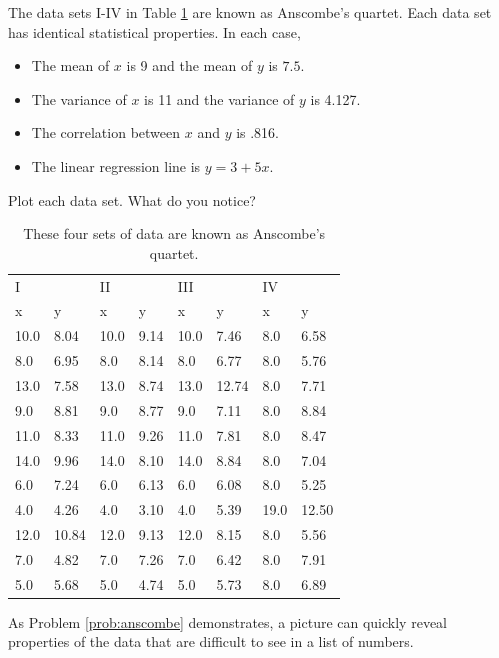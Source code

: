 \begin{problem}\label{prob:anscombe}
The data sets I-IV in Table \ref{table:anscombe} are known as Anscombe's quartet. 
Each data set has identical statistical properties. 
In each case,
\begin{itemize}
\item The mean of $x$ is 9 and the mean of $y$ is $7.5$.
\item The variance of $x$ is 11 and the variance of $y$ is 4.127.
\item The correlation between $x$ and $y$ is .816.
\item The linear regression line is $y=3+5x$.
\end{itemize}
Plot each data set. What do you notice?

\begin{table}[H]
\begin{tabular}{l l  |  l l  |  l l  |  l l }
I & & II & & III & & IV\\
x & y & x & y & x & y & x & y \\
\hline
10.0 & 8.04 & 10.0 & 9.14 & 10.0 & 7.46 & 8.0 & 6.58 \\
8.0 & 6.95 & 8.0 & 8.14 & 8.0 & 6.77 & 8.0 & 5.76 \\
13.0 & 7.58 & 13.0 & 8.74 & 13.0 & 12.74 & 8.0 & 7.71 \\
9.0 & 8.81 & 9.0 & 8.77 & 9.0 & 7.11 & 8.0 & 8.84 \\
11.0 & 8.33 & 11.0 & 9.26 & 11.0 & 7.81 & 8.0 & 8.47 \\
14.0 & 9.96 & 14.0 & 8.10 & 14.0 & 8.84 & 8.0 & 7.04 \\
6.0 & 7.24 & 6.0 & 6.13 & 6.0 & 6.08 & 8.0 & 5.25 \\
4.0 & 4.26 & 4.0 & 3.10 & 4.0 & 5.39 & 19.0 & 12.50 \\
12.0 & 10.84 & 12.0 & 9.13 & 12.0 & 8.15 & 8.0 & 5.56 \\
7.0 & 4.82 & 7.0 & 7.26 & 7.0 & 6.42 & 8.0 & 7.91 \\
5.0 & 5.68 & 5.0 & 4.74 & 5.0 & 5.73 & 8.0 & 6.89 \\
\end{tabular}
\caption{These four sets of data are known as Anscombe's quartet.}
\label{table:anscombe}
\end{table}
\end{problem}

As Problem \ref{prob:anscombe} demonstrates, a picture can quickly reveal properties of the data that are difficult to see in a list of numbers.


